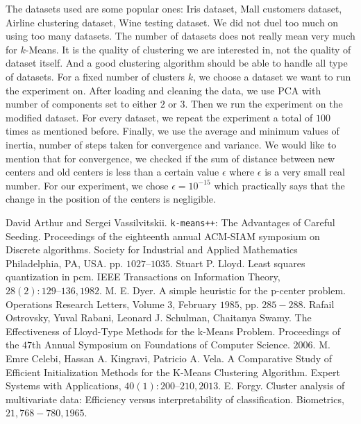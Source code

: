 \documentclass[10pt, leqno]{article}
\begin{document}
	The datasets used are some popular ones: Iris dataset, Mall customers dataset, Airline clustering dataset, Wine testing dataset. We did not duel too much on using too many datasets. The number of datasets does not really mean very much for $k$-Means. It is the quality of clustering we are interested in, not the quality of dataset itself. And a good clustering algorithm should be able to handle all type of datasets. For a fixed number of clusters $k$, we choose a dataset we want to run the experiment on. After loading and cleaning the data, we use PCA with number of components set to either $2$ or $3$. Then we run the experiment on the modified dataset. For every dataset, we repeat the experiment a total of $100$ times as mentioned before. Finally, we use the average and minimum values of inertia, number of steps taken for convergence and variance. We would like to mention that for convergence, we checked if the sum of distance between new centers and old centers is less than a certain value $\epsilon$ where $\epsilon$ is a very small real number. For our experiment, we chose $\epsilon=10^{-15}$ which practically says that the change in the position of the centers is negligible.
	\begin{thebibliography}{99}
		 David Arthur and Sergei Vassilvitskii. \texttt{k-means++}: The Advantages of Careful Seeding. Proceedings of the eighteenth annual ACM-SIAM symposium on Discrete algorithms. Society for Industrial and Applied Mathematics Philadelphia, PA, USA. pp. $1027–1035$.
		 Stuart P. Lloyd. Least squares quantization in pcm. IEEE Transactions on Information Theory, $28(2):129–136, 1982$.
		 M. E. Dyer. A simple heuristic for the p-center problem. Operations Research Letters, Volume $3$, February $1985$, pp. $285-288$.
		 Rafail Ostrovsky, Yuval Rabani, Leonard J. Schulman, Chaitanya Swamy. The Effectiveness of Lloyd-Type Methods for the k-Means Problem. Proceedings of the $47$th Annual Symposium on Foundations of Computer Science. $2006$.
		 M. Emre Celebi, Hassan A. Kingravi, Patricio A. Vela. A Comparative Study of Efficient Initialization Methods for the K-Means Clustering Algorithm. Expert Systems with Applications, $40(1): 200–210, 2013$.
		 E. Forgy. Cluster analysis of multivariate data: Efficiency versus interpretability of classification. Biometrics, $21, 768-780, 1965$.
	\end{thebibliography}
\end{document}
